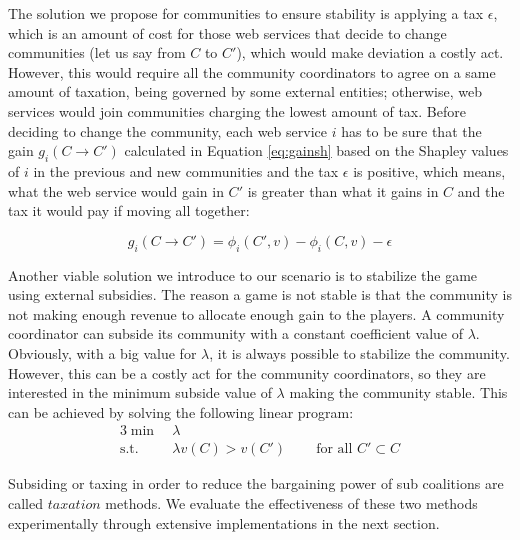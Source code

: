 The solution we propose for communities to ensure stability is
applying a tax $\epsilon$, which is an amount of cost for those
web services that decide to change communities (let us say from
$C$ to $C'$), which would make deviation a costly act. However,
this would require all the community coordinators to agree on a
same amount of taxation, being governed by some external entities;
otherwise, web services would join communities charging the lowest
amount of tax. Before deciding to change the community, each web
service $i$ has to be sure that the gain $g_i(C \rightarrow C')$
calculated in Equation \ref{eq:gainsh} based on the Shapley values
of $i$ in the previous and new communities and the tax $\epsilon$
is positive, which means, what the web service would gain in $C'$
is greater than what it gains in $C$ and the tax it would pay if
moving all together:


\begin{equation}\label{eq:gainsh}
g_i(C \rightarrow C') = \phi_i(C',v) - \phi_i(C,v) - \epsilon
\end{equation}


Another viable solution we introduce to our scenario is to
stabilize the game using external subsidies. The reason a game is
not stable is that the community is not making enough revenue to
allocate enough gain to the players. A community coordinator can
subside its community with a constant coefficient value of
$\lambda$.
%
%
Obviously, with a big value for $\lambda$, it is always possible
to stabilize the community. However, this can be a costly act for
the community coordinators, so they are interested in the minimum
subside value of $\lambda$ making the community stable. This can
be achieved by solving the following linear program:
%
  \begin{alignat*}{3}
    \min~   & \lambda  \\
    \text{s.t. } & \lambda v(C) > v(C') & ~& \text{ for all } C' \subset C
  \end{alignat*}


Subsiding or taxing in order to reduce the
bargaining power of sub coalitions are called $taxation$
\cite{eps346856} methods. We evaluate the effectiveness of these
two methods experimentally through extensive implementations in
the next section.



